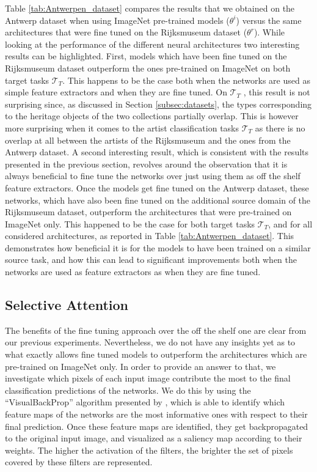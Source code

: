 Table \ref{tab:Antwerpen_dataset} compares the results that we obtained on the Antwerp dataset when using ImageNet pre-trained models ($\theta^{i}$) versus the same architectures that were fine tuned on the Rijksmuseum dataset ($\theta^{r}$). While looking at the performance of the different neural architectures two interesting results can be highlighted. First, models which have been fine tuned on the Rijksmuseum dataset outperform the ones pre-trained on ImageNet on both target tasks $\mathcal{T}_T$. This happens to be the case both when the networks are used as simple feature extractors and when they are fine tuned. On $\mathcal{T}_T$ , this result is not surprising since, as discussed in Section \ref{subsec:datasets}, the types corresponding to the heritage objects of the two collections partially overlap. This is however more surprising when it comes to the artist classification tasks $\mathcal{T}_T$  as there is no overlap at all between the artists of the Rijksmuseum and the ones from the Antwerp dataset.
A second interesting result, which is consistent with the results presented in the previous section, revolves around the observation that it is always beneficial to fine tune the networks over just using them as off the shelf feature extractors. Once the models get fine tuned on the Antwerp dataset, these networks, which have also been fine tuned on the additional source domain of the Rijksmuseum dataset, outperform the architectures that were pre-trained on ImageNet only. This happened to be the case for both target tasks $\mathcal{T}_T$, and for all considered architectures, as reported in Table \ref{tab:Antwerpen_dataset}. This demonstrates how beneficial it is for the models to have been trained on a similar source task, and how this can lead to significant improvements both when the networks are used as feature extractors as when they are fine tuned. 



\subsection{Selective Attention}

The benefits of the fine tuning approach over the off the shelf one are clear from our previous experiments. Nevertheless, we do not have any insights yet as to what exactly allows fine tuned models to outperform the architectures which are pre-trained on ImageNet only. In order to provide an answer to that, we investigate which pixels of each input image contribute the most to the final classification predictions of the networks. We do this by using the ``VisualBackProp'' algorithm presented by \cite{bojarski2016visualbackprop}, which is able to identify which feature maps of the networks are the most informative ones with respect to their final prediction. Once these feature maps are identified, they get backpropagated to the original input image, and visualized as a saliency map according to their weights. The higher the activation of the filters, the brighter the set of pixels covered by these filters are represented.

